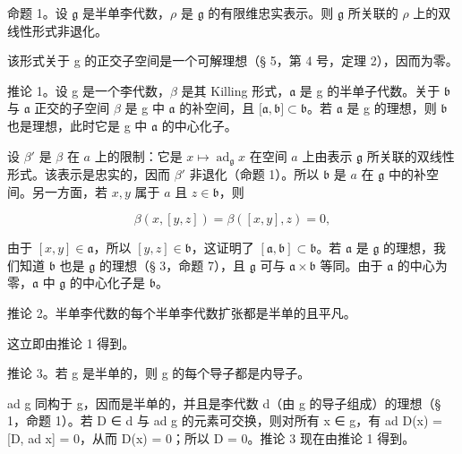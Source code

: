 命题 1。设 \(\mathfrak{g}\) 是半单李代数，\(\rho\) 是 \(\mathfrak{g}\) 的有限维忠实表示。则 \(\mathfrak{g}\) 所关联的 \(\rho\) 上的双线性形式非退化。

该形式关于 g 的正交子空间是一个可解理想（§ 5，第 4 号，定理 2），因而为零。

推论 1。设 g 是一个李代数，\(\beta\) 是其 Killing 形式，\(\mathfrak{a}\) 是 g 的半单子代数。关于 \(\mathfrak{b}\) 与 \(\mathfrak{a}\) 正交的子空间 \(\beta\) 是 g 中 \(\mathfrak{a}\) 的补空间，且 \({[}\mathfrak{a}, \mathfrak{b}{]} \subset \mathfrak{b}\)。若 \(\mathfrak{a}\) 是 g 的理想，则 \(\mathfrak{b}\) 也是理想，此时它是 g 中 \(\mathfrak{a}\) 的中心化子。

设 \(\beta'\) 是 \(\beta\) 在 \(a\) 上的限制：它是 \(x \mapsto \operatorname{ad}_{\mathfrak{g}} x\) 在空间 \(a\) 上由表示 \(\mathfrak{g}\) 所关联的双线性形式。该表示是忠实的，因而 \(\beta'\) 非退化（命题 1）。所以 \(\mathfrak{b}\) 是 \(a\) 在 \(\mathfrak{g}\) 中的补空间。另一方面，若 \(x, y\) 属于 \(a\) 且 \(z \in \mathfrak{b}\)，则

\[
\beta (x, [ y, z ]) = \beta ([ x, y ], z) = 0,
\]

由于 \([x,y] \in \mathfrak{a}\)，所以 \([y,z] \in \mathfrak{b}\)，这证明了 \([\mathfrak{a},\mathfrak{b}] \subset \mathfrak{b}\)。若 \(\mathfrak{a}\) 是 \(\mathfrak{g}\) 的理想，我们知道 \(\mathfrak{b}\) 也是 \(\mathfrak{g}\) 的理想（§ 3，命题 7），且 \(\mathfrak{g}\) 可与 \(\mathfrak{a} \times \mathfrak{b}\) 等同。由于 \(\mathfrak{a}\) 的中心为零，\(\mathfrak{a}\) 中 \(\mathfrak{g}\) 的中心化子是 \(\mathfrak{b}\)。

推论 2。半单李代数的每个半单李代数扩张都是半单的且平凡。

这立即由推论 1 得到。

推论 3。若 g 是半单的，则 g 的每个导子都是内导子。

ad g 同构于 g，因而是半单的，并且是李代数 d（由 g 的导子组成）的理想（§ 1，命题 1）。若 D ∈ d 与 ad g 的元素可交换，则对所有 x ∈ g，有 ad D(x) = {[}D, ad x{]} = 0，从而 D(x) = 0；所以 D = 0。推论 3 现在由推论 1 得到。
\relax{}

